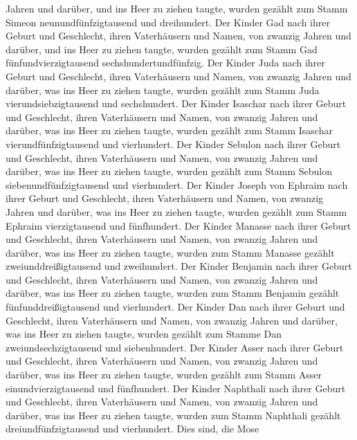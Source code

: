 Jahren und darüber, und ins Heer zu ziehen taugte,  wurden
gezählt zum Stamm Simeon neunundfünfzigtausend und dreihundert.
 Der Kinder Gad nach ihrer Geburt und Geschlecht, ihren
Vaterhäusern und Namen, von zwanzig Jahren und darüber, und ins Heer zu
ziehen taugte,  wurden gezählt zum Stamm Gad
fünfundvierzigtausend sechshundertundfünfzig.  Der Kinder
Juda nach ihrer Geburt und Geschlecht, ihren Vaterhäusern und Namen, von
zwanzig Jahren und darüber, was ins Heer zu ziehen taugte, 
wurden gezählt zum Stamm Juda vierundsiebzigtausend und sechshundert.
 Der Kinder Isaschar nach ihrer Geburt und Geschlecht,
ihren Vaterhäusern und Namen, von zwanzig Jahren und darüber, was ins
Heer zu ziehen taugte,  wurden gezählt zum Stamm Isaschar
vierundfünfzigtausend und vierhundert.  Der Kinder Sebulon
nach ihrer Geburt und Geschlecht, ihren Vaterhäusern und Namen, von
zwanzig Jahren und darüber, was ins Heer zu ziehen taugte, 
wurden gezählt zum Stamm Sebulon siebenundfünfzigtausend und
vierhundert.  Der Kinder Joseph von Ephraim nach ihrer
Geburt und Geschlecht, ihren Vaterhäusern und Namen, von zwanzig Jahren
und darüber, was ins Heer zu ziehen taugte,  wurden gezählt
zum Stamm Ephraim vierzigtausend und fünfhundert.  Der
Kinder Manasse nach ihrer Geburt und Geschlecht, ihren Vaterhäusern und
Namen, von zwanzig Jahren und darüber, was ins Heer zu ziehen taugte,
 wurden zum Stamm Manasse gezählt zweiunddreißigtausend und
zweihundert.  Der Kinder Benjamin nach ihrer Geburt und
Geschlecht, ihren Vaterhäusern und Namen, von zwanzig Jahren und
darüber, was ins Heer zu ziehen taugte,  wurden zum Stamm
Benjamin gezählt fünfunddreißigtausend und vierhundert. 
Der Kinder Dan nach ihrer Geburt und Geschlecht, ihren Vaterhäusern und
Namen, von zwanzig Jahren und darüber, was ins Heer zu ziehen taugte,
 wurden gezählt zum Stamme Dan zweiundsechzigtausend und
siebenhundert.  Der Kinder Asser nach ihrer Geburt und
Geschlecht, ihren Vaterhäusern und Namen, von zwanzig Jahren und
darüber, was ins Heer zu ziehen taugte,  wurden gezählt zum
Stamm Asser einundvierzigtausend und fünfhundert.  Der
Kinder Naphthali nach ihrer Geburt und Geschlecht, ihren Vaterhäusern
und Namen, von zwanzig Jahren und darüber, was ins Heer zu ziehen
taugte,  wurden zum Stamm Naphthali gezählt
dreiundfünfzigtausend und vierhundert.  Dies sind, die Mose
